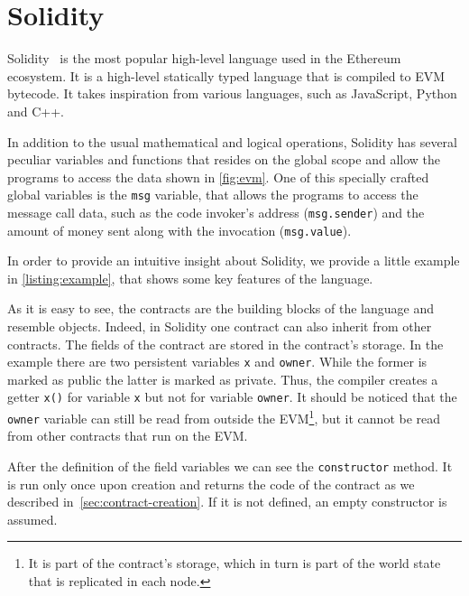 \section{Solidity}
\label{sec:solidity}
Solidity~\cite{bib:solidity-docs} is the most popular high-level language used
in the Ethereum ecosystem. It is a high-level statically typed language that is
compiled to EVM bytecode. It takes inspiration from various languages, such as
JavaScript, Python and C++.

In addition to the usual mathematical and logical operations, Solidity has
several peculiar variables and functions that resides on the global scope and
allow the programs to access the data shown in \autoref{fig:evm}. One of this
specially crafted global variables is the \texttt{msg} variable, that allows the
programs to access the message call data, such as the code invoker's address
(\texttt{msg.sender}) and the amount of money sent along with the invocation
(\texttt{msg.value}).

In order to provide an intuitive insight about Solidity, we provide a little
example in \autoref{listing:example}, that shows some key features of the
language.

\begin{figure}[!h] 
\end{figure}

As it is easy to see, the contracts are the building blocks of the language and
resemble objects. Indeed, in Solidity one contract can also inherit from other
contracts. The fields of the contract are stored in the contract's storage. In
the example there are two persistent variables \verb|x| and \verb|owner|. While
the former is marked as public the latter is marked as private. Thus, the
compiler creates a getter \verb|x()| for variable \verb|x| but not for variable
\verb|owner|. It should be noticed that the \verb|owner| variable can still be
read from outside the EVM\footnote{It is part of the contract's storage, which
in turn is part of the world state that is replicated in each node.}, but it
cannot be read from other contracts that run on the EVM.


After the definition of the field variables we can see the \texttt{constructor}
method. It is run only once upon creation and returns the code of the contract
as we described in~\autoref{sec:contract-creation}. If it is not defined, an
empty constructor is assumed.

